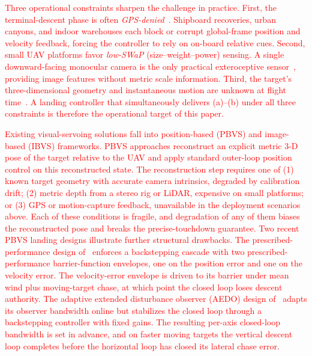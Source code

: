 \documentclass{IEEEtaes}
\newcommand{\new}[1]{\textcolor{red}{#1}}
\begin{document}
\new{Three operational constraints sharpen the challenge in practice. First, the terminal-descent phase is often \emph{GPS-denied}~\cite{xie2016}. Shipboard recoveries, urban canyons, and indoor warehouses each block or corrupt global-frame position and velocity feedback, forcing the controller to rely on on-board relative cues. Second, small UAV platforms favor \emph{low-SWaP} (size--weight--power) sensing. A single downward-facing monocular camera is the only practical exteroceptive sensor~\cite{chaumette2006, herisse2012}, providing image features without metric scale information. Third, the target's three-dimensional geometry and instantaneous motion are unknown at flight time~\cite{chen2025, bouazza2025}. A landing controller that simultaneously delivers (a)--(b) under all three constraints is therefore the operational target of this paper.}

\new{Existing visual-servoing solutions fall into position-based (PBVS) and image-based (IBVS) frameworks. PBVS approaches reconstruct an explicit metric 3-D pose of the target relative to the UAV and apply standard outer-loop position control on this reconstructed state. The reconstruction step requires one of (1) known target geometry with accurate camera intrinsics, degraded by calibration drift; (2) metric depth from a stereo rig or LiDAR, expensive on small platforms; or (3) GPS or motion-capture feedback, unavailable in the deployment scenarios above. Each of these conditions is fragile, and degradation of any of them biases the reconstructed pose and breaks the precise-touchdown guarantee. Two recent PBVS landing designs illustrate further structural drawbacks. The prescribed-performance design of~\cite{lin2022} enforces a backstepping cascade with two prescribed-performance barrier-function envelopes, one on the position error and one on the velocity error. The velocity-error envelope is driven to its barrier under mean wind plus moving-target chase, at which point the closed loop loses descent authority. The adaptive extended disturbance observer (AEDO) design of~\cite{zhang2026} adapts its observer bandwidth online but stabilizes the closed loop through a backstepping controller with fixed gains. The resulting per-axis closed-loop bandwidth is set in advance, and on faster moving targets the vertical descent loop completes before the horizontal loop has closed its lateral chase error.}
\end{document}
